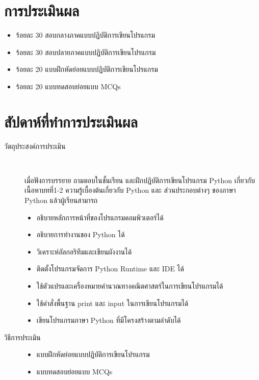 \section*{การประเมินผล}

\begin{itemize}
\item ร้อยละ 30 สอบกลางภาคแบบปฏิบัติการเขียนโปรแกรม
\item ร้อยละ 30 สอบปลายภาคแบบปฏิบัติการเขียนโปรแกรม
\item ร้อยละ 20 แบบฝึกหัดย่อยแบบปฏิบัติการเขียนโปรแกรม
\item ร้อยละ 20 แบบทดสอบย่อยแบบ MCQs
\end{itemize}

\section*{สัปดาห์ที่ทำการประเมินผล}

\newcommand{\weeklyevaluation}[3]{
\begin{tcolorbox}[breakable,enhanced,fonttitle=\bfseries,title=สัปดาห์ที่ {#1},colback=myblue!05,colframe=myblue]
	\vspace{0.5cm}
	\begin{description}
	\item[วัตถุประสงค์การประเมิน] \hfill \\
	{#2}
	\item[วิธีการประเมิน] \hfill
	{#3}
	\end{description}
	\vspace{1cm}
\end{tcolorbox}
\vspace{1.5cm}
}

\weeklyevaluation{3}{
	เมื่อฟังการบรรยาย ถามตอบในชั้นเรียน และฝึกปฏิบัติการเขียนโปรแกรม Python เกี่ยวกับเนื้อหาบทที่1-2 ความรู้เบื้องต้นเกี่ยวกับ Python และ ส่วนประกอบต่างๆ ของภาษา Python แล้วผู้เรียนสามารถ 
	\begin{itemize}
	\item อธิบายหลักการหน้าที่ของโปรแกรมคอมพิวเตอร์ได้
	\item อธิบายการทำงานของ Python ได้
	\item วิเคราะห์อัลกอริทึมและเขียนผังงานได้
	\item ติดตั้งโปรแกรมจัดการ Python Runtime และ IDE ได้
	\item ใช้ตัวแปรและเครื่องหมายคำนวณทางคณิตศาสตร์ในการเขียนโปรแกรมได้
	\item ใช้คำสั่งพื้นฐาน print และ input ในการเขียนโปรแกรมได้
	\item เขียนโปรแกรมภาษา Python ที่มีโครงสร้างตามลำดับได้
	\end{itemize}
}{
	\begin{itemize}
	\item แบบฝึกหัดย่อยแบบปฏิบัติการเขียนโปรแกรม
	\item แบบทดสอบย่อยแบบ MCQs
	\end{itemize}
}

